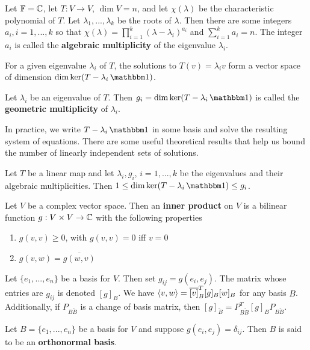 \begin{defn}
    Let $\operatorname{\mathbb{F}}=\operatorname{\mathbb{C}}$, let $T : V\to V$, $\dim V = n$, and let $\chi(\lambda)$ be the characteristic polynomial of $T$. Let $\lambda_1,...,\lambda_k$ be the roots of $\lambda$. Then there are some integers $a_i,i=1,...,k$ so that $\chi(\lambda) = \prod_{i=1}^k (\lambda-\lambda_i)^{a_i}$ and $\sum_{i=1}^k a_i = n$. The integer $a_i$ is called the \textbf{algebraic multiplicity} of the eigenvalue $\lambda_i$.
\end{defn}
For a given eigenvalue $\lambda_i$ of $T$, the solutions to $T(v)=\lambda_i v$ form a vector space of dimension $\dim \ker(T-\lambda_i\One)$.
\begin{defn} Let $\lambda_i$ be an eigenvalue of $T$. Then $g_i=\dim \ker(T-\lambda_i\One)$ is called the \textbf{geometric multiplicity} of $\lambda_i$.
\end{defn}
In practice, we write $T-\lambda_i\One$ in some basis and solve the resulting system of equations. There are some useful theoretical results that help us bound the number of linearly independent sets of solutions.
\begin{thm}
    Let $T$ be a linear map and let $\lambda_i,g_i$, $i=1,...,k$ be the eigenvalues and their algebraic multiplicities. Then $1\leq \dim \ker (T-\lambda_i \One) \leq g_i$.
\end{thm}
\begin{defn}
Let $V$ be a complex vector space. Then an \textbf{inner product} on $V$ is a bilinear function $g : V \times V \to \operatorname{\mathbb{C}}$ with the following properties
\begin{enumerate}
\item {
$g(v,v)\geq 0$, with $g(v,v)=0$ iff $v=0$
}
\item {
$g(v,w)=\overline{g(w,v)}$
}
\end{enumerate}
\end{defn}
\begin{defn}
    Let $\{e_1,...,e_n\}$ be a basis for $V$. Then set $g_{ij} = g(e_i,e_j)$. The matrix whose entries are $g_{ij}$ is denoted $[g]_B$. We have $\langle v,w\rangle = \overline{[v]}^T_B [g]_B [w]_B$ for any basis $B$. Additionally, if $P_{B\tilde{B}}$ is a change of basis matrix, then $[g]_{\tilde{B}} = P_{B\tilde{B}}^T [g]_B P_{B\tilde{B}}$.
\end{defn}
\begin{defn}
    Let $B=\{e_1,...,e_n\}$ be a basis for $V$ and suppose $g(e_i,e_j)=\delta_{ij}$. Then $B$ is said to be an \textbf{orthonormal basis}.
\end{defn}
